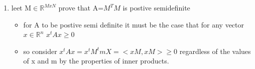 \documentclass[12pt,twoside]{article}
\begin{document}
\begin{enumerate}[label=7.2]
\begin{enumerate}
{        }
        \item leet M$\in \mathbb{R}^{MxN}$ prove that A=$M^TM$ is postive semidefinite 
    \begin{itemize}
    \item for A to be postive semi definite it must be the case that for any vector $x\in\mathbb{R}^n$ $x^tAx\geq0$
    \item so consider $x^tAx=x^tM^tmX=<xM,xM>\geq 0$ regardless of the values of x and m by the properties of inner products.
    \end{itemize}
\end{enumerate}
\end{enumerate}
\end{document}
